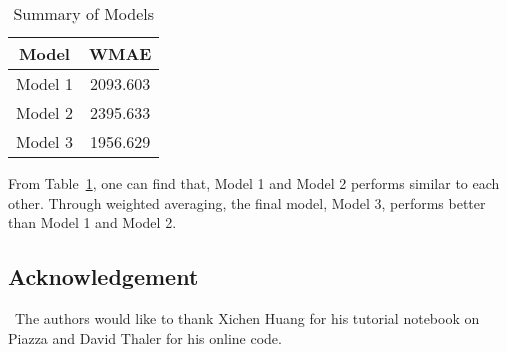 \documentclass[12pt]{article}
\begin{document}
\begin{table}[htb]
 \caption{Summary of Models} \label{result}
 \vspace{0.1in}
\begin{center}
  \begin{tabular}{  c  c  }
  
    \hline
    Model          &WMAE     \\ \hline
    Model 1         & 2093.603    \\ \hline
    Model 2         & 2395.633    \\ \hline
    Model 3         & 1956.629    \\ \hline
  \end{tabular}
\end{center}
\end{table}

From Table~\ref{result}, one can find that, Model 1 and Model 2 performs similar to each other. Through weighted averaging, the final model, Model 3, performs better than Model 1 and Model 2.

\subsection*{Acknowledgement}

\quad\ The authors would like to thank Xichen Huang for his tutorial notebook on Piazza and David Thaler for his online code.

\vfill\pagebreak

%
\end{document}
